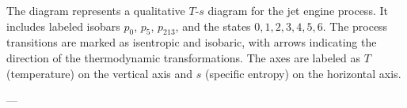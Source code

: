 The diagram represents a qualitative \( T \)-\( s \) diagram for the jet engine process. It includes labeled isobars \( p_0 \), \( p_5 \), \( p_{213} \), and the states \( 0, 1, 2, 3, 4, 5, 6 \). The process transitions are marked as isentropic and isobaric, with arrows indicating the direction of the thermodynamic transformations. The axes are labeled as \( T \) (temperature) on the vertical axis and \( s \) (specific entropy) on the horizontal axis.  

---